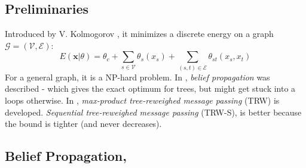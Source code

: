 \documentclass[10pt,a4paper]{article}
\begin{document}
\subsection{Preliminaries}

Introduced by V. Kolmogorov \cite{Kol}, it minimizes a discrete energy on a graph $\mathcal{G} = (\mathcal{V},\mathcal{E})$:
\begin{equation}
E(\mathbf{x} |\theta) = \theta_c + \sum_{s\in\mathcal{V}} \theta_s(x_s) + \sum_{(s,t)\in\mathcal{E}} \theta_{st}(x_s,x_t)
\label{eq:21}
\end{equation}
For a general graph, it is a NP-hard problem. In \cite{Pearl}, \emph{belief propagation} was described - which gives the exact optimum for trees, but might get stuck into a loops otherwise. In \cite{Wain}, \emph{max-product tree-reweighed message passing} (TRW) is developed. \emph{Sequential tree-reweighed message passing} (TRW-S), \cite{Kol} is better because the bound is tighter (and never decreases).


\subsection{Belief Propagation, \cite{Pearl}}
\end{document}
